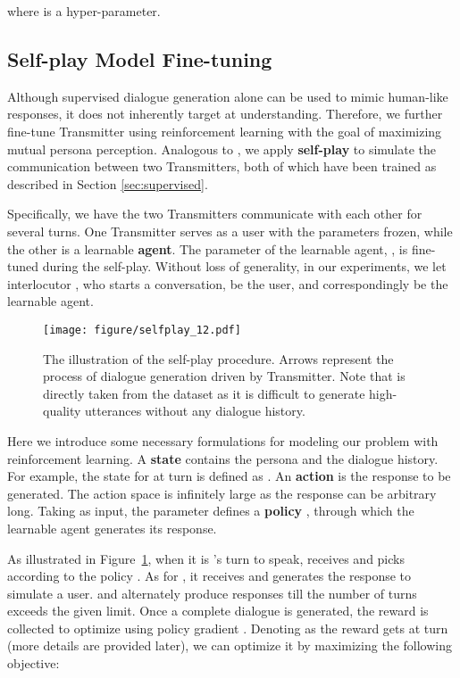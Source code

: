 \documentclass[11pt,a4paper]{article}
\begin{document}
where  is a hyper-parameter.

\subsection{Self-play Model Fine-tuning}

Although supervised dialogue generation alone can be used to mimic human-like responses, it does not inherently target at understanding. Therefore, we further fine-tune Transmitter using reinforcement learning with the goal of maximizing mutual persona perception. Analogous to \citet{lewis2017deal}, we apply \textbf{self-play} to simulate the communication between two Transmitters, both of which have been trained as described in Section \ref{sec:supervised}. 

Specifically, we have the two Transmitters communicate with each other for several turns. One Transmitter serves as a user with the parameters frozen, while the other is a learnable \textbf{agent}. The parameter of the learnable agent, , is fine-tuned during the self-play. Without loss of generality, in our experiments, we let interlocutor , who starts a conversation, be the user, and correspondingly  be the learnable agent.

\begin{figure}
    \centering
    \texttt{[image: figure/selfplay\_12.pdf]}
    \caption{The illustration of the self-play procedure. Arrows  represent the process of dialogue generation driven by Transmitter. Note that  is directly taken from the dataset as it is difficult to generate high-quality utterances without any dialogue history.}
    \label{fig:self_play}
\end{figure}

Here we introduce some necessary formulations for modeling our problem with reinforcement learning. 
A \textbf{state} contains the persona and the dialogue history. For example, the state for  at turn  is defined as . 
An \textbf{action}  is the response to be generated. The action space is infinitely large as the response can be arbitrary long. Taking  as input, the parameter  defines a \textbf{policy} , through which the learnable agent generates its response.

As illustrated in Figure~\ref{fig:self_play}, when it is 's turn to speak,  receives  and picks  according to the policy . As for , it receives  and generates the response  to simulate a user.
 and  alternately produce responses till the number of turns exceeds the given limit. Once a complete dialogue is generated, the reward is collected to optimize  using policy gradient \cite{sutton2000policy}. Denoting as  the reward  gets at turn  (more details are provided later), we can optimize it by maximizing the following objective:
\end{document}
